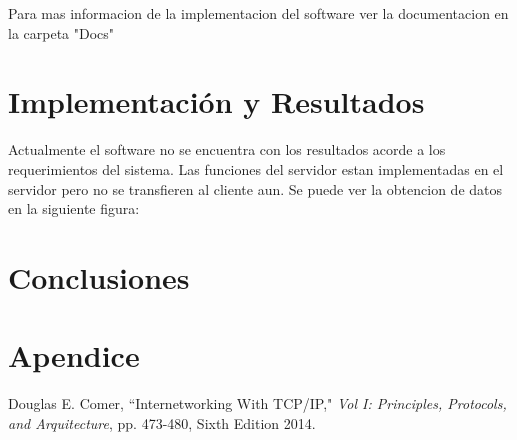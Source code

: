 \documentclass[10pt, a4paper,notitlepage]{article}
\begin{document}
Para mas informacion de la implementacion del software ver la documentacion en la carpeta "Docs"



\section{Implementación y Resultados}
Actualmente el software no se encuentra con los resultados acorde a los requerimientos del sistema. Las funciones del servidor estan implementadas en el servidor pero no se transfieren al cliente aun. Se puede ver la obtencion de datos en la siguiente figura:


\section{Conclusiones}

\section{Apendice}

\begin{thebibliography}{100} %
 Douglas E. Comer, ``Internetworking With TCP/IP," \emph{Vol I: Principles, Protocols, and Arquitecture}, pp. 473-480, Sixth Edition 2014.
\end{thebibliography}
\end{document}
